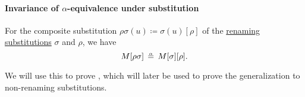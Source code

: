 \paragraph{Invariance of \( \alpha \)-equivalence under substitution}

\begin{lemma}\label{thm:renaming_composition_is_alpha_equivalent}
  For the composite substitution \( \rho\sigma(u) \coloneqq \sigma(u)[\rho] \) of the \hyperref[def:lambda_renaming]{renaming substitutions} \( \sigma \) and \( \rho \), we have
  \begin{equation}\label{eq:thm:renaming_composition_is_alpha_equivalent}
    M[\rho\sigma] \aequiv M[\sigma][\rho].
  \end{equation}
\end{lemma}
\begin{comments}
  \item We will use this to prove , which will later be used to prove the generalization  to non-renaming substitutions.
\end{comments}

